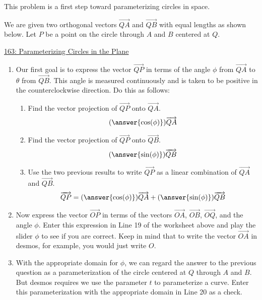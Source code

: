 \documentclass{ximera}
\begin{document}
\begin{question}  \label{Qdfds45rt54rr3tg}
This problem is a first step toward parameterizing circles in space. 

We are given two orthogonal vectors $\overrightarrow{QA}$ and $\overrightarrow{QB}$ with equal lengths as shown below. Let $P$ be a point on the circle through $A$ and $B$ centered at $Q$. 

\begin{onlineOnly}
    \begin{center}
\end{center}
\end{onlineOnly}

\href{https://www.desmos.com/calculator/arrfrcusn5}{163: Parameterizing Circles in the Plane}

\begin{enumerate}
\item{Our first goal is to express the vector $\overrightarrow{QP}$ in terms of the angle $\phi$ from $\overrightarrow{QA}$ to  $\theta$ from $\overrightarrow{QB}$. This angle is measured continuously and is taken to be positive in the counterclockwise direction. Do this as follows:}

\begin{enumerate}
\item{Find the vector projection of $\overrightarrow{QP}$ onto $\overrightarrow{QA}$.
\[
    ( \answer{\cos(\phi)} )\overrightarrow{QA}
\]
}
 \item{Find the vector projection of $\overrightarrow{QP}$ onto $\overrightarrow{QB}$.
\[
    ( \answer{\sin(\phi)} ) \overrightarrow{QB}
\]
}

\item{Use the two previous results to write $\overrightarrow{QP}$ as a linear combination of  $\overrightarrow{QA}$ and $\overrightarrow{QB}$.
\[
  \overrightarrow{QP} = ( \answer{\cos(\phi)} )\overrightarrow{QA} + (\answer{\sin(\phi)}) \overrightarrow{QB}
\]
}

\end{enumerate}

\item{Now express the vector $\overrightarrow{OP}$ in terms of the vectors $\overrightarrow{OA}$, $\overrightarrow{OB}$, $\overrightarrow{OQ}$, and the angle $\phi$. Enter this expression in Line 19 of the worksheet above and play the slider $\phi$ to see if you are correct. Keep in mind that to write the vector $\overrightarrow{OA}$ in desmos, for example, you would just write $O$.
}

\item{With the appropriate domain for $\phi$, we can regard the answer to the previous question as a parameterization of the circle centered at $Q$ through $A$ and $B$. But desmos requires we use the parameter $t$ to parameterize a curve. Enter this parameterization with the appropriate domain in Line 20 as a check.}

\end{enumerate} 

\end{question}
\end{document}
